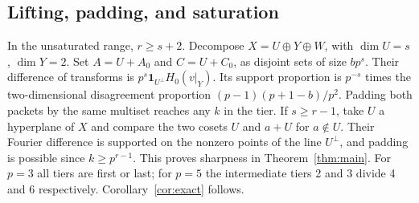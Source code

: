 \documentclass[11pt]{article}
\theoremstyle{definition}\newtheorem{definition}[theorem]{Definition}
\theoremstyle{remark}\newtheorem{remark}[theorem]{Remark}
\begin{document}
\subsection{Lifting, padding, and saturation}
In the unsaturated range, $r\ge s+2$. Decompose $X=U\oplus Y\oplus W$, with $\dim U=s$, $\dim Y=2$. Set $A=U+A_0$ and $C=U+C_0$, as disjoint sets of size $bp^s$. Their difference of transforms is $p^s\mathbf1_{U^\perp}H_0(v|_Y)$. Its support proportion is $p^{-s}$ times the two-dimensional disagreement proportion $(p-1)(p+1-b)/p^2$. Padding both packets by the same multiset reaches any $k$ in the tier. If $s\ge r-1$, take $U$ a hyperplane of $X$ and compare the two cosets $U$ and $a+U$ for $a\notin U$. Their Fourier difference is supported on the nonzero points of the line $U^\perp$, and padding is possible since $k\ge p^{r-1}$. This proves sharpness in Theorem~\ref{thm:main}. For $p=3$ all tiers are first or last; for $p=5$ the intermediate tiers 2 and 3 divide 4 and 6 respectively. Corollary~\ref{cor:exact} follows.
\end{document}
